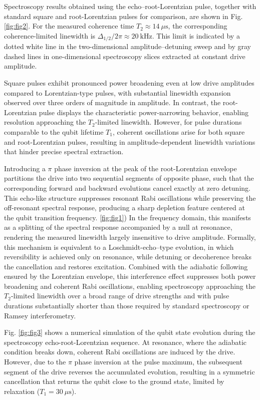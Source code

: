 Spectroscopy results obtained using the echo–root-Lorentzian pulse, together with standard square and root-Lorentzian pulses for comparison, are shown in Fig. \ref{fig:fig2}. For the measured coherence time $T_2 \approx 14~\mu\mathrm{s}$,
the corresponding coherence-limited linewidth is
$\Delta_{1/2}/2\pi \approx 20~\mathrm{kHz}$. This limit is indicated by a dotted white line in the two-dimensional amplitude--detuning sweep and by gray dashed lines
in one-dimensional spectroscopy slices extracted at constant drive amplitude.

Square pulses exhibit pronounced power broadening even at low drive
amplitudes compared to Lorentzian-type pulses, with substantial linewidth
expansion observed over three orders of magnitude in amplitude.  In contrast, the root-Lorentzian pulse displays the characteristic power-narrowing behavior, enabling resolution approaching the $T_2$-limited linewidth. However, for pulse durations comparable to the qubit lifetime $T_1$, coherent oscillations arise for both square and root-Lorentzian pulses,
resulting in amplitude-dependent linewidth variations that hinder precise
spectral extraction.

Introducing a $\pi$ phase inversion at the peak of the root-Lorentzian envelope partitions the drive into two sequential segments of opposite phase, such that the corresponding forward and backward evolutions cancel exactly at zero detuning. This echo-like structure suppresses resonant Rabi oscillations while preserving the off-resonant spectral response, producing a sharp depletion feature centered at the qubit transition frequency. \ref{fig:fig1}) In the frequency domain, this manifests as a splitting of the spectral response accompanied by a null at resonance, rendering the measured linewidth largely insensitive to drive amplitude. Formally, this mechanism is equivalent to a Loschmidt-echo–type evolution, in which reversibility is achieved only on resonance, while detuning or decoherence breaks the cancellation and restores excitation. Combined with the adiabatic following ensured by the Lorentzian envelope, this interference effect suppresses both power broadening and coherent Rabi oscillations, enabling spectroscopy approaching the $T_2$-limited linewidth over a broad range of drive strengths and with pulse durations substantially shorter than those required by standard spectroscopy or Ramsey interferometry.

Fig. \ref{fig:fig3} shows a numerical simulation of the qubit state evolution during the spectroscopy echo-root-Lorentzian sequence. At resonance, where the adiabatic condition breaks down, coherent Rabi oscillations are induced by the drive. However, due to the $\pi$ phase inversion at the pulse maximum, the subsequent segment of the drive reverses the accumulated evolution, resulting in a symmetric cancellation that returns the qubit close to the ground state, limited by relaxation ($T_1 = 30~\mu\mathrm{s}$).

